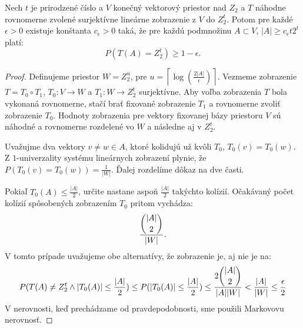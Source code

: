 \begin{theorem}
\label{theorem-set-onto-by-linear-transform}
Nech $t$ je prirodzené číslo a $V$ konečný vektorový priestor nad $Z_2$ a $T$ náhodne rovnomerne zvolené surjektívne lineárne zobrazenie z $V$ do $Z_2^{t}$. Potom pre každé $\epsilon > 0$ existuje konštanta $c_\epsilon > 0$ taká, že pre každú podmnožinu $A \subset V$, $|A| \geq c_\epsilon t 2^t$ platí:
\begin{displaymath}
P(T(A) = Z_2^t) \geq 1 - \epsilon \textit{.}
\end{displaymath}
\end{theorem}
\begin{proof}
Definujeme priestor $W = Z_2^u$, pre $u = \left\lceil \log (\frac{2|A|}{\epsilon}) \right\rceil$. Vezmeme zobrazenie $T = T_0 \circ T_1$, $T_0: V \rightarrow W$ a $T_1: W \rightarrow Z_2^t$ surjektívne. Aby voľba zobrazenia $T$ bola vykonaná rovnomerne, stačí brať fixované zobrazenie $T_1$ a rovnomerne zvoliť zobrazenie $T_0$. Hodnoty zobrazenia pre vektory fixovanej bázy priestoru $V$ sú náhodné a rovnomerne rozdelené vo $W$ a následne aj v $Z_2^t$.

Uvažujme dva vektory $v \neq w \in A$, ktoré kolidujú už kvôli $T_0$, $T_0(v) = T_0(w)$. Z $1$-univerzality systému lineárnych zobrazení plynie, že $P(T_0(v) = T_0(w)) = \frac{1}{|W|}$. Ďalej rozdelíme dôkaz na dve časti. 

Pokiaľ $T_0(A) \leq \frac{|A|}{2}$, určite nastane aspoň $\frac{|A|}{2}$ takýchto kolízií. Očakávaný počet kolízií spôsobených zobrazením $T_0$ pritom vychádza:
\[
\frac{\dbinom{|A|}{2}}{|W|}\textit{.}
\]
V tomto prípade uvažujeme obe alternatívy, že zobrazenie je, aj nie je na:
\begin{displaymath}
P(T(A) \neq Z_2^t \wedge |T_0(A)| \leq \frac{|A|}{2}) \leq P(|T_0(A)| \leq \frac{|A|}{2}) \leq \frac{2 \dbinom{|A|}{2}}{|A||W|} < \frac{|A|}{|W|} \leq \frac{\epsilon}{2}
\end{displaymath}
V nerovnosti, keď prechádzame od pravdepodobnosti, sme použili Markovovu nerovnosť.


\end{proof}
